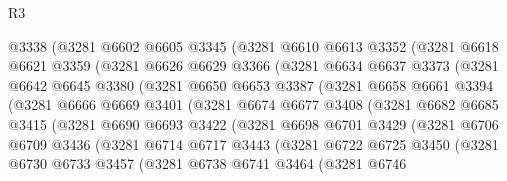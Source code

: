 \begin{lexlean}{R3}
\begin{coremodule}
          @3338
          (@3281
            @6602
            @6605
            @3345
            (@3281
              @6610
              @6613
              @3352
              (@3281
                @6618
                @6621
                @3359
                (@3281
                  @6626
                  @6629
                  @3366
                  (@3281
                    @6634
                    @6637
                    @3373
                    (@3281
                      @6642
                      @6645
                      @3380
                      (@3281
                        @6650
                        @6653
                        @3387
                        (@3281
                          @6658
                          @6661
                          @3394
                          (@3281
                            @6666
                            @6669
                            @3401
                            (@3281
                              @6674
                              @6677
                              @3408
                              (@3281
                                @6682
                                @6685
                                @3415
                                (@3281
                                  @6690
                                  @6693
                                  @3422
                                  (@3281
                                    @6698
                                    @6701
                                    @3429
                                    (@3281
                                      @6706
                                      @6709
                                      @3436
                                      (@3281
                                        @6714
                                        @6717
                                        @3443
                                        (@3281
                                          @6722
                                          @6725
                                          @3450
                                          (@3281
                                            @6730
                                            @6733
                                            @3457
                                            (@3281
                                              @6738
                                              @6741
                                              @3464
                                              (@3281
                                                @6746

\end{coremodule}
\end{lexlean}
